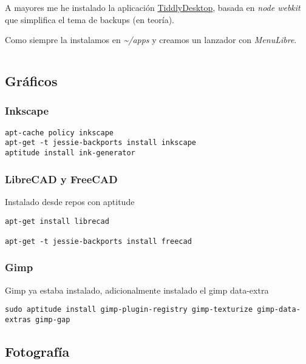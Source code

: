 \documentclass[12pt,spanish,]{article}
\begin{document}
A mayores me he instalado la aplicación
\href{https://github.com/Jermolene/TiddlyDesktop}{TiddlyDesktop}, basada
en \emph{node webkit} que simplifica el tema de backups (en teoría).

Como siempre la instalamos en \emph{\textasciitilde{}/apps} y creamos un
lanzador con \emph{MenuLibre}.

\begin{verbatim}
\end{verbatim}

\subsection{Gráficos}\label{gruxe1ficos}

\subsubsection{Inkscape}\label{inkscape}

\begin{verbatim}
apt-cache policy inkscape
apt-get -t jessie-backports install inkscape
aptitude install ink-generator
\end{verbatim}

\subsubsection{LibreCAD y FreeCAD}\label{librecad-y-freecad}

Instalado desde repos con aptitude

\begin{verbatim}
apt-get install librecad

apt-get -t jessie-backports install freecad
\end{verbatim}

\subsubsection{Gimp}\label{gimp}

Gimp ya estaba instalado, adicionalmente instalado el gimp data-extra

\begin{verbatim}
sudo aptitude install gimp-plugin-registry gimp-texturize gimp-data-extras gimp-gap
\end{verbatim}

\subsection{Fotografía}\label{fotografuxeda}
\end{document}

